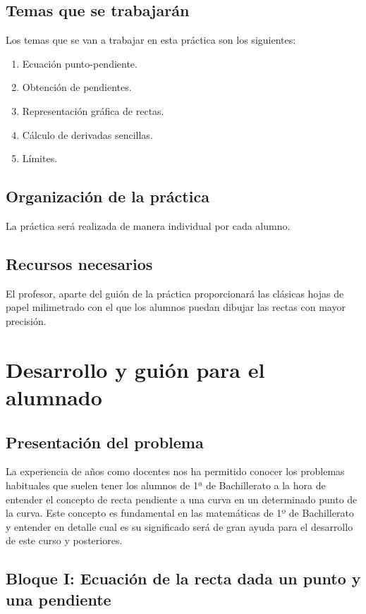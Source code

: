 \documentclass[palatino,nobuilddate,nochap]{apuntesURJC}
\begin{document}
\subsection{Temas que se trabajarán}
Los temas que se van a trabajar en esta práctica son los siguientes: 
\begin{enumerate}
	\item Ecuación punto-pendiente.
	\item Obtención de pendientes.
	\item Representación gráfica de rectas. 
	\item Cálculo de derivadas sencillas. 
	\item Límites.
\end{enumerate}

\subsection{Organización de la práctica}
La práctica será realizada de manera individual por cada alumno.

\subsection{Recursos necesarios}
El profesor, aparte del guión de la práctica proporcionará las clásicas hojas de papel milimetrado con el que los alumnos puedan dibujar las rectas con mayor precisión.
\newpage

\section{Desarrollo y guión para el alumnado}

\subsection{Presentación del problema}
La experiencia de años como docentes nos ha permitido conocer los problemas habituales que suelen tener los alumnos de 1ª de Bachillerato a la hora de entender el concepto de recta pendiente a una curva en un determinado punto de la curva. Este concepto es fundamental en las matemáticas de 1º de Bachillerato y entender en detalle cual es su significado será de gran ayuda para el desarrollo de este curso y posteriores.

\newpage
\subsection{Bloque I: Ecuación de la recta dada un punto y una pendiente}
\end{document}
